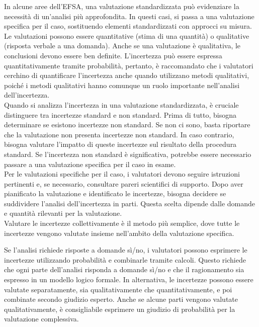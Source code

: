In alcune aree dell'EFSA, una valutazione standardizzata può evidenziare la necessità di un'analisi più approfondita. In questi casi, si passa a una valutazione specifica per il caso, sostituendo elementi standardizzati con approcci su misura.\\
Le valutazioni possono essere quantitative (stima di una quantità) o qualitative (risposta verbale a una domanda). Anche se una valutazione è qualitativa, le conclusioni devono essere ben definite. L'incertezza può essere espressa quantitativamente tramite probabilità, pertanto, è raccomandato che i valutatori cerchino di quantificare l'incertezza anche quando utilizzano metodi qualitativi, poiché i metodi qualitativi hanno comunque un ruolo importante nell'analisi dell'incertezza.\\

Quando si analizza l'incertezza in una valutazione standardizzata, è cruciale distinguere tra incertezze standard e non standard. Prima di tutto, bisogna determinare se esistono incertezze non standard. Se non ci sono, basta riportare che la valutazione non presenta incertezze non standard. In caso contrario, bisogna valutare l'impatto di queste incertezze sul risultato della procedura standard. Se l'incertezza non standard è significativa, potrebbe essere necessario passare a una valutazione specifica per il caso in esame.\\


Per le valutazioni specifiche per il caso, i valutatori devono seguire istruzioni pertinenti e, se necessario, consultare pareri scientifici di supporto. Dopo aver pianificato la valutazione e identificato le incertezze, bisogna decidere se suddividere l'analisi dell'incertezza in parti. Questa scelta dipende dalle domande e quantità rilevanti per la valutazione. \\
Valutare le incertezze collettivamente è il metodo più semplice, dove tutte le incertezze vengono valutate insieme nell'ambito della valutazione specifica.

Se l'analisi richiede risposte a domande sì/no, i valutatori possono esprimere le incertezze utilizzando probabilità e combinarle tramite calcoli. Questo richiede che ogni parte dell'analisi risponda a domande sì/no e che il ragionamento sia espresso in un modello logico formale. In alternativa, le incertezze possono essere valutate separatamente, sia qualitativamente che quantitativamente, e poi combinate secondo giudizio esperto. Anche se alcune parti vengono valutate qualitativamente, è consigliabile esprimere un giudizio di probabilità per la valutazione complessiva.\\


